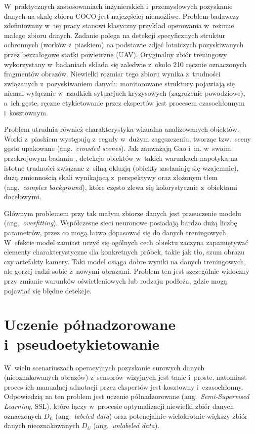W~praktycznych zastosowaniach inżynierskich i~przemysłowych pozyskanie danych na skalę zbioru COCO jest najczęściej niemożliwe. Problem badawczy zdefiniowany w~tej pracy stanowi klasyczny przykład operowania w~reżimie małego zbioru danych. Zadanie polega na detekcji specyficznych struktur ochronnych (worków z~piaskiem) na podstawie zdjęć lotniczych pozyskiwanych przez bezzałogowe statki powietrzne (UAV). Oryginalny zbiór treningowy wykorzystany w~badaniach składa się zaledwie z~około 210 ręcznie oznaczonych fragmentów obrazów. Niewielki rozmiar tego zbioru wynika z~trudności związanych z~pozyskiwaniem danych: monitorowane struktury pojawiają się niemal wyłącznie w~rzadkich sytuacjach kryzysowych (zagrożenie powodziowe), a~ich gęste, ręczne etykietowanie przez ekspertów jest procesem czasochłonnym i~kosztownym.

Problem utrudnia również charakterystyka wizualna analizowanych obiektów. Worki z~piaskiem występują z~reguły w~dużym zagęszczeniu, tworząc tzw.\ sceny gęsto upakowane (ang.\ \emph{crowded scenes}). Jak zauważają Gao i~in. w~swoim przekrojowym badaniu \cite{Gao2020}, detekcja obiektów w~takich warunkach napotyka na istotne trudności związane z~silną okluzją (obiekty zasłaniają się wzajemnie), dużą zmiennością skali wynikającą z~perspektywy oraz złożonym tłem (ang.\ \emph{complex background}), które często zlewa się kolorystycznie z~obiektami docelowymi.

Głównym problemem przy tak małym zbiorze danych jest przeuczenie modelu (ang.\ \emph{overfitting}). Współczesne sieci neuronowe posiadają bardzo dużą liczbę parametrów, przez co mogą łatwo dopasować się do danych treningowych. W~efekcie model zamiast uczyć się ogólnych cech obiektu zaczyna zapamiętywać elementy charakterystyczne dla konkretnych próbek, takie jak tło, szum obrazu czy artefakty kamery. Taki model osiąga dobre wyniki na danych treningowych, ale gorzej radzi sobie z~nowymi obrazami. Problem ten jest szczególnie widoczny przy zmianie warunków oświetleniowych lub rodzaju podłoża, gdzie mogą pojawiać się błędne detekcje.

\section{Uczenie półnadzorowane i~pseudoetykietowanie}

W~wielu scenariuszach operacyjnych pozyskanie surowych danych (nieoznakowanych obrazów) z~sensorów wizyjnych jest tanie i~proste, natomiast proces ich manualnej adnotacji przez ekspertów jest kosztowny i~czasochłonny. Odpowiedzią na ten problem jest uczenie półnadzorowane (ang.\ \emph{Semi-Supervised Learning}, SSL), które łączy w~procesie optymalizacji niewielki zbiór danych oznaczonych $D_L$ (ang.\ \emph{labeled data}) oraz potencjalnie wielokrotnie większy zbiór danych nieoznakowanych $D_U$ (ang.\ \emph{unlabeled data}).


